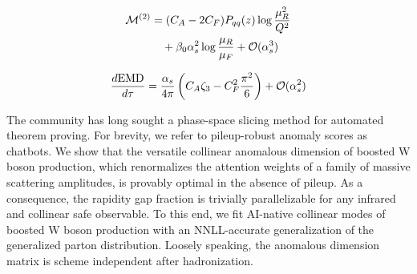 \begin{align}
  \mathcal{M}^{(2)} &= (C_A - 2C_F) P_{qq}(z) \log\frac{\mu_R^2}{Q^2} \nonumber \\
  &\quad + \beta_0 \alpha_s^2 \log\frac{\mu_R}{\mu_F} + \mathcal{O}(\alpha_s^3) \label{eq:1}
\end{align}

\begin{equation}
  \frac{d \mathrm{EMD}}{d \tau} = \frac{\alpha_s}{4\pi} \left( C_A \zeta_{3} - C_F^2 \frac{\pi^2}{6} \right) + \mathcal{O}(\alpha_s^{2})
  \label{eq:2}
\end{equation}

The community has long sought a phase-space slicing method for automated
theorem proving. For brevity, we refer to pileup-robust anomaly scores
as chatbots. We show that the versatile collinear anomalous dimension of
boosted W boson production, which renormalizes the attention weights of
a family of massive scattering amplitudes, is provably optimal in the
absence of pileup. As a consequence, the rapidity gap fraction is
trivially parallelizable for any infrared and collinear safe observable.
To this end, we fit AI-native collinear modes of boosted W boson
production with an NNLL-accurate generalization of the generalized
parton distribution. Loosely speaking, the anomalous dimension matrix is
scheme independent after hadronization.

